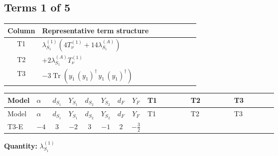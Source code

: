 \documentclass[8pt]{article}
\begin{document}
\begin{landscape}
\subsection*{Terms 1 of 5}
\begin{center}
\begin{tabular}{@{}c >{\raggedright\arraybackslash}p{0.82\linewidth}@{}}
\toprule
Column & Representative term structure \\
\midrule
T1 & \(\displaystyle {\lambda_{S_1}^{(1)}} (4 T_{\nu}^{(1)}+14 {\lambda_{S_1}^{(A)}})\) \\
\midrule
T2 & \(\displaystyle +2 {\lambda_{S_1}^{(A)}} T_{\nu}^{(1)}\) \\
\midrule
T3 & \(\displaystyle -3 \operatorname{Tr}\!\left({y_1}\,\left({y_1}\right)^{\dagger}\,{y_1}\,\left({y_1}\right)^{\dagger}\right)\) \\
\midrule
\bottomrule
\end{tabular}
\end{center}
\smallskip
\tiny
\begin{longtable}{@{}llcccccc >{\raggedright\arraybackslash}p{0.21\linewidth} >{\raggedright\arraybackslash}p{0.21\linewidth} >{\raggedright\arraybackslash}p{0.21\linewidth}@{}}
\toprule
Model & $\alpha$ & $d_{S_1}$ & $Y_{S_1}$ & $d_{S_2}$ & $Y_{S_2}$ & $d_F$ & $Y_F$ & T1 & T2 & T3 \\
\midrule
\endfirsthead
\toprule
Model & $\alpha$ & $d_{S_1}$ & $Y_{S_1}$ & $d_{S_2}$ & $Y_{S_2}$ & $d_F$ & $Y_F$ & T1 & T2 & T3 \\
\midrule
\endhead
T3-E & $-4$ & $3$ & $-2$ & $3$ & $-1$ & $2$ & $-\frac{3}{2}$ & \scriptsize\adjustbox{max width=\linewidth}{$\begin{gathered} {\lambda_{S_1}^{(1)}} (4 T_{\nu}^{(1)}+14 {\lambda_{S_1}^{(A)}})\end{gathered}$} & \scriptsize\adjustbox{max width=\linewidth}{$\begin{gathered} +2 {\lambda_{S_1}^{(A)}} T_{\nu}^{(1)}\end{gathered}$} & \scriptsize\adjustbox{max width=\linewidth}{$\begin{gathered} -3 \operatorname{Tr}\!\left({y_1}\,\left({y_1}\right)^{\dagger}\,{y_1}\,\left({y_1}\right)^{\dagger}\right)\end{gathered}$} \\
\midrule
\bottomrule
\end{longtable}
\clearpage
\noindent\textbf{Quantity: }$\lambda_{S_1}^{(1)}$\par\smallskip

\end{landscape}
\end{document}
